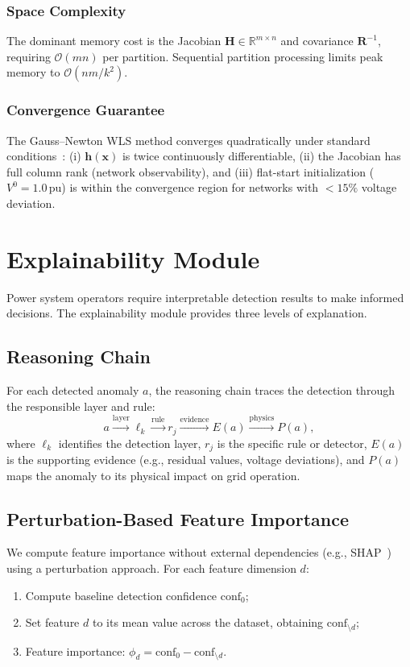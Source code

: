 \documentclass[research]{fcs}
\begin{document}
\subsubsection{Space Complexity}
The dominant memory cost is the Jacobian $\mathbf{H} \in \mathbb{R}^{m \times n}$ and covariance $\mathbf{R}^{-1}$, requiring $\mathcal{O}(mn)$ per partition. Sequential partition processing limits peak memory to $\mathcal{O}(nm/k^2)$.

\subsubsection{Convergence Guarantee}
The Gauss--Newton WLS method converges quadratically under standard conditions~\cite{wls_gauss_newton}: (i) $\mathbf{h}(\mathbf{x})$ is twice continuously differentiable, (ii) the Jacobian has full column rank (network observability), and (iii) flat-start initialization ($V^0 = 1.0$\,pu) is within the convergence region for networks with $< 15\%$ voltage deviation.
\section{Explainability Module}

Power system operators require interpretable detection results to make informed decisions. The explainability module provides three levels of explanation.

\subsection{Reasoning Chain}

For each detected anomaly $a$, the reasoning chain traces the detection through the responsible layer and rule:
\begin{equation}
a \xrightarrow{\text{layer}} \ell_k \xrightarrow{\text{rule}} r_j \xrightarrow{\text{evidence}} E(a) \xrightarrow{\text{physics}} P(a),
\end{equation}
where $\ell_k$ identifies the detection layer, $r_j$ is the specific rule or detector, $E(a)$ is the supporting evidence (e.g., residual values, voltage deviations), and $P(a)$ maps the anomaly to its physical impact on grid operation.

\subsection{Perturbation-Based Feature Importance}

We compute feature importance without external dependencies (e.g., SHAP~\cite{shap_lundberg2017}) using a perturbation approach. For each feature dimension $d$:
\begin{enumerate}
\item Compute baseline detection confidence $\text{conf}_0$;
\item Set feature $d$ to its mean value across the dataset, obtaining $\text{conf}_{\setminus d}$;
\item Feature importance: $\phi_d = \text{conf}_0 - \text{conf}_{\setminus d}$.
\end{enumerate}
\end{document}
